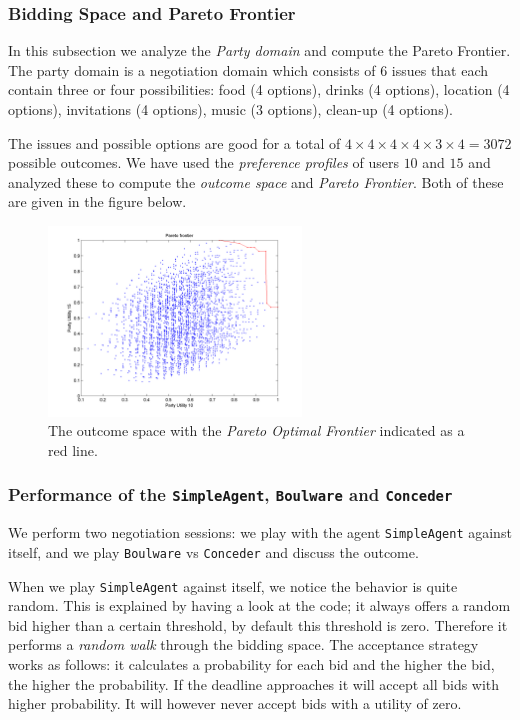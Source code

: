\documentclass[a4paper,10pt]{article}
\begin{document}
\subsubsection{Bidding Space and Pareto Frontier}

In this subsection we analyze the \emph{Party domain} and compute the Pareto Frontier. The party domain is a negotiation domain which consists of $6$ issues that each contain three or four possibilities: food (4 options), drinks (4 options), location (4 options), invitations (4 options),   music (3 options), clean-up (4 options).

The issues and possible options are good for a total of $4 \times 4 \times 4 \times 4 \times 3 \times 4 = 3072$ possible outcomes. We have used the \emph{preference profiles} of users $10$ and $15$ and analyzed these to compute the \emph{outcome space} and \emph{Pareto Frontier}. Both of these are given in the figure below.

\begin{figure}[H]
\begin{center}
 \includegraphics[width=0.6\textwidth]{pareto.png}
 \caption{The outcome space with the \emph{Pareto Optimal Frontier} indicated as a red line.}
 \label{fig:pareto} 
\end{center}
\end{figure}

\subsubsection{Performance of the \texttt{SimpleAgent}, \texttt{Boulware} and \texttt{Conceder}}

We perform two negotiation sessions: we play with the agent \texttt{SimpleAgent} against itself, and we play \texttt{Boulware} vs \texttt{Conceder} and discuss the outcome. 

When we play \texttt{SimpleAgent} against itself, we notice the behavior is quite random. This is explained by having a look at the code; it always offers a random bid higher than a certain threshold,
by default this threshold is zero. Therefore it performs a \emph{random walk} through the 
bidding space. The acceptance strategy works as follows: it calculates a probability for each bid and the higher the bid, the higher the probability. If the deadline approaches it will accept all bids with higher probability. It will however never accept bids with a utility of zero. 
\end{document}
